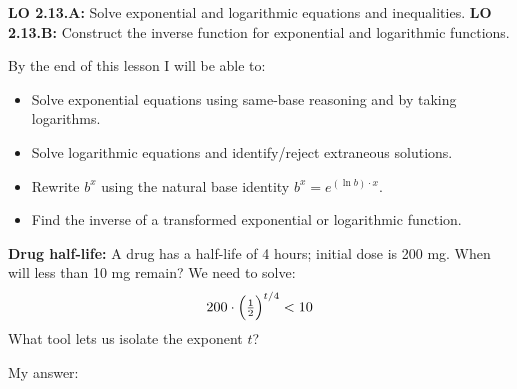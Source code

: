 \documentclass[10pt]{article}
\begin{document}
\namedateperiod

\vspace{0.08in}

\begin{objectivebox}
\textbf{LO 2.13.A:} Solve exponential and logarithmic equations and inequalities. \quad
\textbf{LO 2.13.B:} Construct the inverse function for exponential and logarithmic functions.

By the end of this lesson I will be able to:
\begin{itemize}[leftmargin=1.5em,itemsep=3pt,topsep=3pt]
  \item Solve exponential equations using same-base reasoning and by taking logarithms.
  \item Solve logarithmic equations and identify/reject extraneous solutions.
  \item Rewrite $b^x$ using the natural base identity $b^x = e^{(\ln b)\cdot x}$.
  \item Find the inverse of a transformed exponential or logarithmic function.
\end{itemize}
\end{objectivebox}

\vspace{0.06in}

\begin{vocabbox}
\end{vocabbox}

\vspace{0.06in}

\begin{hookbox}
\textbf{Drug half-life:} A drug has a half-life of 4 hours; initial dose is 200 mg.
When will less than 10 mg remain? We need to solve:
\[
  200\cdot\Bigl(\tfrac{1}{2}\Bigr)^{t/4} < 10
\]
What tool lets us isolate the exponent $t$?

\vspace{4pt}
My answer: \writeline
\end{hookbox}

\vspace{0.06in}
\end{document}
